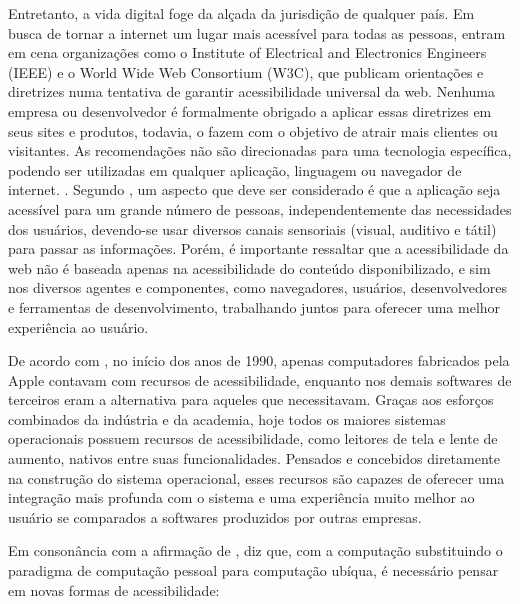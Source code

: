 \documentclass[twoside,english,brazilian]{UNISINOSartigo}
\begin{document}
Entretanto, a vida digital foge da alçada da jurisdição de qualquer país. Em busca de tornar a internet um lugar mais acessível para todas as pessoas, entram em cena organizações como o Institute of Electrical and Electronics Engineers (IEEE) e o World Wide Web Consortium (W3C), que publicam orientações e diretrizes numa tentativa de garantir acessibilidade universal da web. Nenhuma empresa ou desenvolvedor é formalmente obrigado a aplicar essas diretrizes em seus sites e produtos, todavia, o fazem com o objetivo de atrair mais clientes ou visitantes. As recomendações não são direcionadas para uma tecnologia específica, podendo ser utilizadas em qualquer aplicação, linguagem ou navegador de internet. \cite{W3Cguideliness}. Segundo , um aspecto que deve ser considerado é que a aplicação seja acessível para um grande número de pessoas, independentemente das necessidades dos usuários, devendo-se usar diversos canais sensoriais (visual, auditivo e tátil) para passar as informações. Porém, é importante ressaltar que a acessibilidade da web não é baseada apenas na acessibilidade do conteúdo disponibilizado, e sim nos diversos agentes e componentes, como navegadores, usuários, desenvolvedores e ferramentas de desenvolvimento, trabalhando juntos para oferecer uma melhor experiência ao usuário.

De acordo com , no início dos anos de 1990, apenas computadores fabricados pela Apple contavam com recursos de acessibilidade, enquanto nos demais softwares de terceiros eram a alternativa para aqueles que necessitavam. Graças aos esforços combinados da indústria e da academia, hoje todos os maiores sistemas operacionais possuem recursos de acessibilidade, como leitores de tela e lente de aumento, nativos entre suas funcionalidades. Pensados e concebidos diretamente na construção do sistema operacional, esses recursos são capazes de oferecer uma integração mais profunda com o sistema e uma experiência muito melhor ao usuário se comparados a softwares produzidos por outras empresas. 

Em consonância com a afirmação de ,  diz que, com a computação substituindo o paradigma de computação pessoal para computação ubíqua, é necessário pensar em novas formas de acessibilidade:
\end{document}
